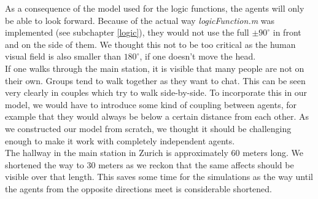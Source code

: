 \noi As a consequence of the model used for the logic functions, the agents will only be able to look forward. Because of the actual way \textit{logicFunction.m} was implemented (see subchapter \ref{logic}), they would not use the full $\pm 90^\circ$ in front and on the side of them. We thought this not to be too critical as the human visual field is also smaller than $180^\circ$, if one doesn't move the head.\\

\noi If one walks through the main station, it is visible that many people are not on their own. Groups tend to walk together as they want to chat. This can be seen very clearly in couples which try to walk side-by-side. To incorporate this in our model, we would have to introduce some kind of coupling between agents, for example that they would always be below a certain distance from each other. As we constructed our model from scratch, we thought it should be challenging enough to make it work with completely independent agents.\\

\noi The hallway in the main station in Zurich is approximately 60 meters long. We shortened the way to 30 meters as we reckon that the same affects should be visible over that length. This saves some time for the simulations as the way until the agents from the opposite directions meet is considerable shortened.



